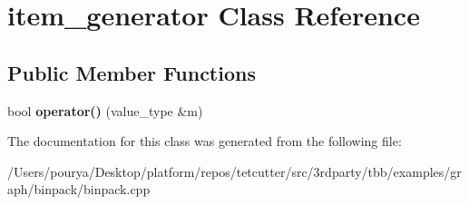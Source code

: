 \hypertarget{classitem__generator}{}\section{item\+\_\+generator Class Reference}
\label{classitem__generator}
\subsection*{Public Member Functions}
\begin{DoxyCompactItemize}
\item 
\hypertarget{classitem__generator_a44a884c0326e72fa988201d4ccebda28}{}bool {\bfseries operator()} (value\+\_\+type \&m)\label{classitem__generator_a44a884c0326e72fa988201d4ccebda28}

\end{DoxyCompactItemize}


The documentation for this class was generated from the following file\+:\begin{DoxyCompactItemize}
\item 
/\+Users/pourya/\+Desktop/platform/repos/tetcutter/src/3rdparty/tbb/examples/graph/binpack/binpack.\+cpp\end{DoxyCompactItemize}
